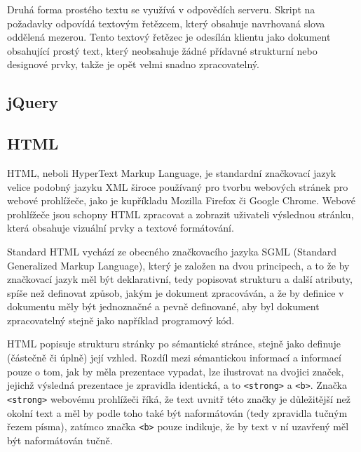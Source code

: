 \documentclass[a4paper,11pt]{article}
\begin{document}
Druhá forma prostého textu se využívá v odpovědích serveru. Skript na požadavky odpovídá textovým řetězcem, který obsahuje navrhovaná slova oddělená mezerou. Tento textový řetězec je odesílán klientu jako dokument obsahující prostý text, který neobsahuje žádné přídavné strukturní nebo designové prvky, takže je opět velmi snadno zpracovatelný.


\subsection{jQuery}


\subsection{HTML}

HTML, neboli HyperText Markup Language, je standardní značkovací jazyk velice podobný jazyku XML široce používaný pro tvorbu webových stránek pro webové prohlížeče, jako je kupříkladu Mozilla Firefox či Google Chrome. Webové prohlížeče jsou schopny HTML zpracovat a zobrazit uživateli výslednou stránku, která obsahuje vizuální prvky a textové formátování. 

Standard HTML vychází ze obecného značkovacího jazyka SGML (Standard Generalized Markup Language), který je založen na dvou principech, a to že by značkovací jazyk měl být deklarativní, tedy popisovat strukturu a další atributy, spíše než definovat způsob, jakým je dokument zpracováván, a že by definice v dokumentu měly být jednoznačné a pevně definované, aby byl dokument zpracovatelný stejně jako například programový kód. %


HTML popisuje strukturu stránky po sémantické stránce, stejně jako definuje (částečně či úplně) její vzhled. Rozdíl mezi sémantickou informací a informací pouze o tom, jak by měla prezentace vypadat, lze ilustrovat na dvojici značek, jejichž výsledná prezentace je zpravidla identická, a to {\tt <strong>} a {\tt <b>}. Značka {\tt <strong>} webovému prohlížeči říká, že text uvnitř této značky je důležitější než okolní text a měl by podle toho také být naformátován (tedy zpravidla tučným řezem písma), zatímco značka {\tt <b>} pouze indikuje, že by text v ní uzavřený měl být naformátován tučně. %
\end{document}
